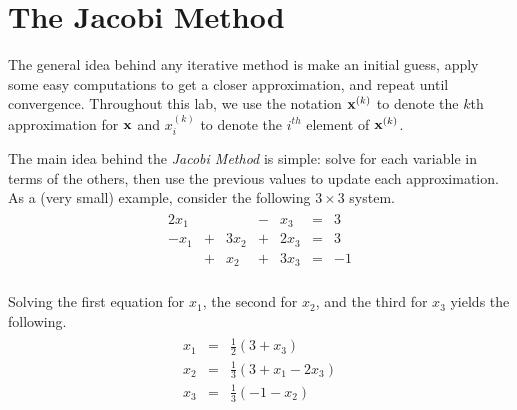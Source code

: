 \label{lab:iter_methods}




\section*{The Jacobi Method} %


The general idea behind any iterative method is make an initial guess, apply some easy computations to get a closer approximation, and repeat until convergence.
Throughout this lab, we use the notation $\mathbf{x}^{(k)}$ to denote the $k$th approximation for $\mathbf{x}$ and $x^{(k)}_i$ to denote the $i^{th}$ element of $\mathbf{x}^{(k)}$.

The main idea behind the \emph{Jacobi Method} is simple: solve for each variable in terms of the others, then use the previous values to update each approximation.
As a (very small) example, consider the following $3 \times 3$ system.
\begin{align*}
\begin{array}{ccccccc}
  2x_1 &   &      & - & x_3  & = & 3  \\
  -x_1 & + & 3x_2 & + & 2x_3 & = & 3  \\
       & + & x_2  & + & 3x_3 & = & -1 \\
\end{array}
\end{align*}

Solving the first equation for $x_1$, the second for $x_2$, and the third for $x_3$ yields the following.
\begin{align*}
\begin{array}{ccc}
    x_1 & = & \frac{1}{2}(3 + x_3) \\
    x_2 & = & \frac{1}{3}(3 + x_1 - 2x_3) \\
    x_3 & = & \frac{1}{3}(-1 - x_2)
\end{array}
\end{align*}

